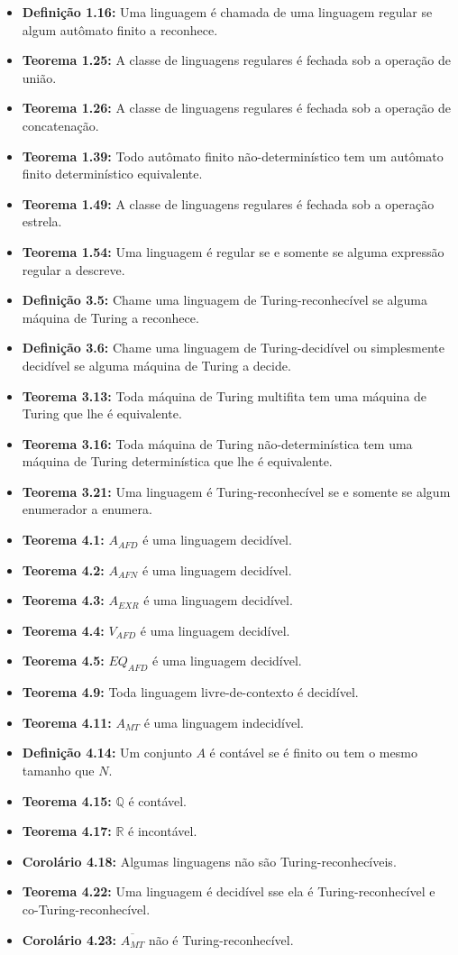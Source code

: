 \documentclass[12pt,a4paper,oneside]{article}
\begin{document}
\begin{itemize}
	
	\item[] {\bf Definição 1.16:} Uma linguagem é chamada de uma linguagem regular se algum autômato finito a reconhece.
	\item[] {\bf Teorema 1.25:} A classe de linguagens regulares é fechada sob a operação de união.
	\item[] {\bf Teorema 1.26:} A classe de linguagens regulares é fechada sob a operação de concatenação.
	\item[] {\bf Teorema 1.39:} Todo autômato finito não-determinístico tem um autômato finito determinístico
	equivalente.
	\item[] {\bf Teorema 1.49:} A classe de linguagens regulares é fechada sob a operação estrela.
	\item[] {\bf Teorema 1.54:} Uma linguagem é regular se e somente se alguma expressão regular a descreve.
	\item[] {\bf Definição 3.5:} Chame uma linguagem de Turing-reconhecível se alguma máquina de Turing a reconhece.
	\item[] {\bf Definição 3.6:} Chame uma linguagem de Turing-decidível ou simplesmente decidível se alguma máquina de Turing a decide.
	\item[] {\bf Teorema 3.13:} Toda máquina de Turing multifita tem uma máquina de Turing que lhe é equivalente.
	\item[] {\bf Teorema 3.16:} Toda máquina de Turing não-determinística tem uma máquina de Turing determinística que lhe é equivalente.
	\item[] {\bf Teorema 3.21:} Uma linguagem é Turing-reconhecível se e somente se algum enumerador a enumera.
	\item[] {\bf Teorema 4.1:} $A_{AFD}$ é uma linguagem decidível.
	\item[] {\bf Teorema 4.2:} $A_{AFN}$ é uma linguagem decidível.
	\item[] {\bf Teorema 4.3:} $A_{EXR}$ é uma linguagem decidível.
	\item[] {\bf Teorema 4.4:} $V_{AFD}$ é uma linguagem decidível.
	\item[] {\bf Teorema 4.5:} $EQ_{AFD}$ é uma linguagem decidível.
	\item[] {\bf Teorema 4.9:} Toda linguagem livre-de-contexto é decidível.
	\item[] {\bf Teorema 4.11:} $A_{MT}$ é uma linguagem indecidível.
	\item[] {\bf Definição 4.14:} Um conjunto $A$ é contável se é finito ou tem o mesmo tamanho que $N$.
	\item[] {\bf Teorema 4.15:} $\mathbb{Q}$ é contável.
	\item[] {\bf Teorema 4.17:} $\mathbb{R}$ é incontável.
	\item[] {\bf Corolário 4.18:} Algumas linguagens não são Turing-reconhecíveis.
	\item[] {\bf Teorema 4.22:} Uma linguagem é decidível sse ela é Turing-reconhecível e co-Turing-reconhecível.
	\item[] {\bf Corolário 4.23:} $\overline{A_{MT}}$ não é Turing-reconhecível.
\end{itemize}
\end{document}
